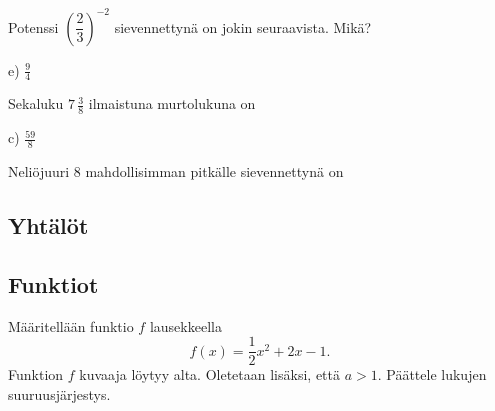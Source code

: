 \begin{tehtava}
Potenssi $\left( \dfrac{2}{3} \right)^{-2}$ sievennettynä on jokin seuraavista. Mikä?
\begin{alakohdat}
\end{alakohdat}
\begin{vastaus}
e) $\frac{9}{4}$
\end{vastaus}
\end{tehtava}

\begin{tehtava}
Sekaluku $7\,\frac{3}{8}$ ilmaistuna murtolukuna on
\begin{alakohdat}
\end{alakohdat}
    \begin{vastaus}
	 c) $\frac{59}{8}$
    \end{vastaus}
\end{tehtava}

\begin{tehtava}
Neliöjuuri 8 mahdollisimman pitkälle sievennettynä on
\begin{alakohdat}
\end{alakohdat}
\end{tehtava}

\subsection*{Yhtälöt}

\subsection*{Funktiot}

\begin{tehtava}
	Määritellään funktio $f$ lausekkeella \[f(x)=\frac{1}{2}x^2+2x-1.\] Funktion $f$ kuvaaja löytyy alta. 
	Oletetaan lisäksi, että $a>1$. Päättele lukujen suuruusjärjestys.
	\begin{alakohdat}
	\end{alakohdat}
    \begin{vastaus}
	\begin{alakohdat}
		\alakohta{$f(a)>f(a+2)$}
		\alakohta{$f(-a)<f(a)$}
	\end{alakohdat}
    \end{vastaus}
\end{tehtava}
\vspace{1cm}
\begin{center}
	\begin{kuvaajapohja}{0.7}{-3}{7}{-5}{3}
	\end{kuvaajapohja}
\end{center}

